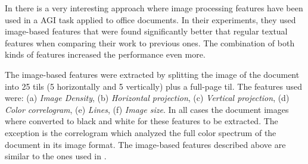 In \parencite{chen2012genre} there is a very interesting approach where image processing features have been used in a AGI task applied to office documents. In their experiments, they used image-based features that were found significantly better that regular textual features when comparing their work to previous ones. The combination of both kinds of features increased the performance even more.

The image-based features were extracted by splitting the image of the document into 25 tils (5 horizontally and 5 vertically) plus a full-page til. The features used were: (a) \textit{Image Density}, (b) \textit{Horizontal projection}, (c) \textit{Vertical projection}, (d) \textit{Color correlogram}, (e) \textit{Lines}, (f) \textit{Image size}. In all cases the document images where converted to black and white for these features to be extracted. The exception is the correlogram which analyzed the full color spectrum of the document in its image format. The image-based features described above are similar to the ones used in \parencite{clark2014you}.

